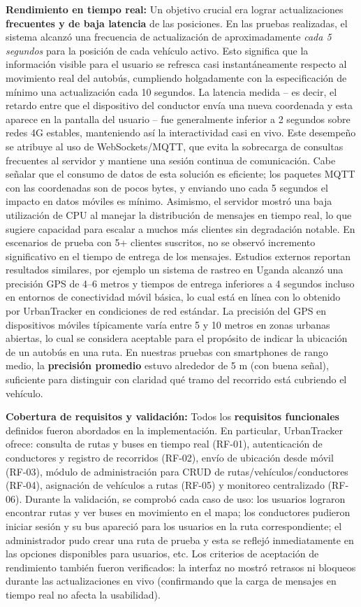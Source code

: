 \textbf{Rendimiento en tiempo real:} Un objetivo crucial era lograr actualizaciones \textbf{frecuentes y de baja latencia} de las posiciones. En las pruebas realizadas, el sistema alcanzó una frecuencia de actualización de aproximadamente \emph{cada 5 segundos} para la posición de cada vehículo activo. Esto significa que la información visible para el usuario se refresca casi instantáneamente respecto al movimiento real del autobús, cumpliendo holgadamente con la especificación de mínimo una actualización cada 10 segundos. La latencia medida -- es decir, el retardo entre que el dispositivo del conductor envía una nueva coordenada y esta aparece en la pantalla del usuario -- fue generalmente inferior a 2 segundos sobre redes 4G estables, manteniendo así la interactividad casi en vivo. Este desempeño se atribuye al uso de WebSockets/MQTT, que evita la sobrecarga de consultas frecuentes al servidor y mantiene una sesión continua de comunicación. Cabe señalar que el consumo de datos de esta solución es eficiente; los paquetes MQTT con las coordenadas son de pocos bytes, y enviando uno cada 5 segundos el impacto en datos móviles es mínimo. Asimismo, el servidor mostró una baja utilización de CPU al manejar la distribución de mensajes en tiempo real, lo que sugiere capacidad para escalar a muchos más clientes sin degradación notable. En escenarios de prueba con 5+ clientes suscritos, no se observó incremento significativo en el tiempo de entrega de los mensajes. Estudios externos reportan resultados similares, por ejemplo un sistema de rastreo en Uganda alcanzó una precisión GPS de 4--6 metros y tiempos de entrega inferiores a 4 segundos incluso en entornos de conectividad móvil básica\cite{anyango2025uganda}, lo cual está en línea con lo obtenido por UrbanTracker en condiciones de red estándar. La precisión del GPS en dispositivos móviles típicamente varía entre 5 y 10 metros en zonas urbanas abiertas, lo cual se considera aceptable para el propósito de indicar la ubicación de un autobús en una ruta. En nuestras pruebas con smartphones de rango medio, la \textbf{precisión promedio} estuvo alrededor de 5 m (con buena señal), suficiente para distinguir con claridad qué tramo del recorrido está cubriendo el vehículo.

\textbf{Cobertura de requisitos y validación:} Todos los \textbf{requisitos funcionales} definidos fueron abordados en la implementación. En particular, UrbanTracker ofrece: consulta de rutas y buses en tiempo real (RF-01), autenticación de conductores y registro de recorridos (RF-02), envío de ubicación desde móvil (RF-03), módulo de administración para CRUD de rutas/vehículos/conductores (RF-04), asignación de vehículos a rutas (RF-05) y monitoreo centralizado (RF-06). Durante la validación, se comprobó cada caso de uso: los usuarios lograron encontrar rutas y ver buses en movimiento en el mapa; los conductores pudieron iniciar sesión y su bus apareció para los usuarios en la ruta correspondiente; el administrador pudo crear una ruta de prueba y esta se reflejó inmediatamente en las opciones disponibles para usuarios, etc. Los criterios de aceptación de rendimiento también fueron verificados: la interfaz no mostró retrasos ni bloqueos durante las actualizaciones en vivo (confirmando que la carga de mensajes en tiempo real no afecta la usabilidad).

